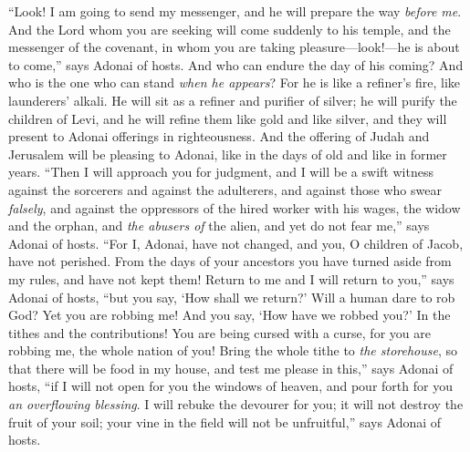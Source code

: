 \begin{biblechapter} %
 “Look! I am going to send my messenger, and he will prepare the way \textit{before me}. And the Lord whom you are seeking will come suddenly to his temple, and the messenger of the covenant, in whom you are taking pleasure—look!—he is about to come,” says Adonai of hosts.
\verse And who can endure the day of his coming? And who is the one who can stand \textit{when he appears}? For he is like a refiner’s fire, like launderers’ alkali.
\verse He will sit as a refiner and purifier of silver; he will purify the children of Levi, and he will refine them like gold and like silver, and they will present to Adonai offerings in righteousness.
\verse And the offering of Judah and Jerusalem will be pleasing to Adonai, like in the days of old and like in former years.
\verse “Then I will approach you for judgment, and I will be a swift witness against the sorcerers and against the adulterers, and against those who swear \textit{falsely}, and against the oppressors of the hired worker with his wages, the widow and the orphan, and \textit{the abusers of} the alien, and yet do not fear me,” says Adonai of hosts.
 “For I, Adonai, have not changed, and you, O children of Jacob, have not perished.
\verse From the days of your ancestors you have turned aside from my rules, and have not kept them! Return to me and I will return to you,” says Adonai of hosts, “but you say, ‘How shall we return?’
\verse Will a human dare to rob God? Yet you are robbing me! And you say, ‘How have we robbed you?’ In the tithes and the contributions!
\verse You are being cursed with a curse, for you are robbing me, the whole nation of you!
\verse Bring the whole tithe to \textit{the storehouse}, so that there will be food in my house, and test me please in this,” says Adonai of hosts, “if I will not open for you the windows of heaven, and pour forth for you \textit{an overflowing blessing}.
\verse I will rebuke the devourer for you; it will not destroy the fruit of your soil; your vine in the field will not be unfruitful,” says Adonai of hosts.

\end{biblechapter}
